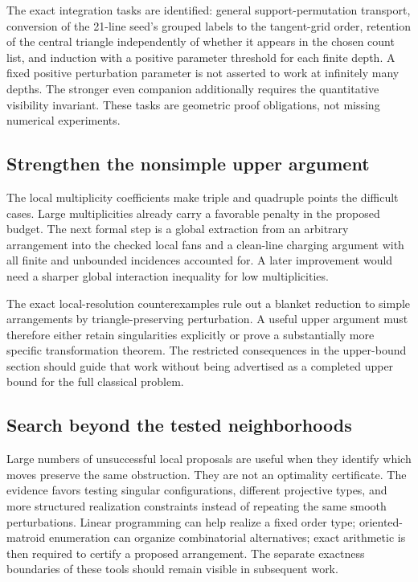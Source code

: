 The exact integration tasks are identified: general support-permutation transport, conversion of the 21-line seed's grouped labels to the tangent-grid order, retention of the central triangle independently of whether it appears in the chosen count list, and induction with a positive parameter threshold for each finite depth. A fixed positive perturbation parameter is not asserted to work at infinitely many depths. The stronger even companion additionally requires the quantitative visibility invariant. These tasks are geometric proof obligations, not missing numerical experiments.

\subsection{Strengthen the nonsimple upper argument}

The local multiplicity coefficients make triple and quadruple points the difficult cases. Large multiplicities already carry a favorable penalty in the proposed budget. The next formal step is a global extraction from an arbitrary arrangement into the checked local fans and a clean-line charging argument with all finite and unbounded incidences accounted for. A later improvement would need a sharper global interaction inequality for low multiplicities.

The exact local-resolution counterexamples rule out a blanket reduction to simple arrangements by triangle-preserving perturbation. A useful upper argument must therefore either retain singularities explicitly or prove a substantially more specific transformation theorem. The restricted consequences in the upper-bound section should guide that work without being advertised as a completed upper bound for the full classical problem.

\subsection{Search beyond the tested neighborhoods}

Large numbers of unsuccessful local proposals are useful when they identify which moves preserve the same obstruction. They are not an optimality certificate. The evidence favors testing singular configurations, different projective types, and more structured realization constraints instead of repeating the same smooth perturbations. Linear programming can help realize a fixed order type; oriented-matroid enumeration can organize combinatorial alternatives; exact arithmetic is then required to certify a proposed arrangement. The separate exactness boundaries of these tools should remain visible in subsequent work.

